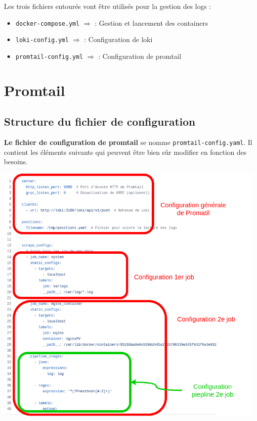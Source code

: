 \documentclass[french, 12pt]{article}%
\newcommand{\itemE}{\item[$\bullet$]}
\begin{document}
Les trois fichiers entourés vont être utilisés pour la gestion des logs : 
\begin{itemize}
\itemE \verb?docker-compose.yml? $\Rightarrow$ : Gestion et lancement des containers 
\itemE \verb?loki-config.yml? $\Rightarrow$ : Configuration de loki
\itemE \verb?promtail-config.yml? $\Rightarrow$  : Configuration de promtail
\end{itemize}




 
 \section{Promtail}
 \subsection{Structure du fichier de configuration}
\textbf{Le fichier de configuration de promtail} se nomme \verb?promtail-config.yaml?. Il contient les éléments suivants qui peuvent être bien sûr modifier en fonction des besoins. 

\begin{center}
\includegraphics[scale=0.45]{./ressource/promtailConf.drawio.png}
\end{center}
\end{document}

